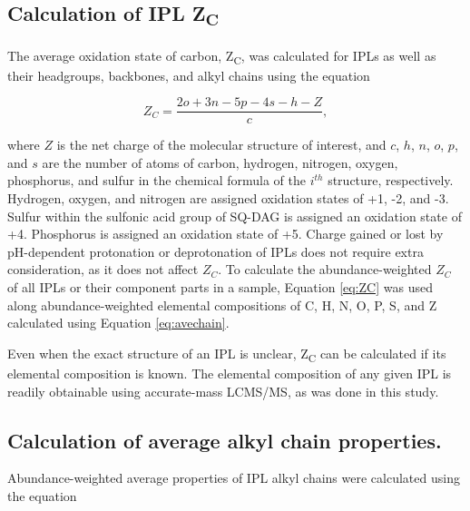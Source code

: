 \subsection{Calculation of IPL Z\textsubscript{C}}
The average oxidation state of carbon, Z\textsubscript{C}, was calculated for IPLs as well as their headgroups, backbones, and alkyl chains using the equation



\begin{equation} \label{eq:ZC}
{Z}_{C} = \frac{2o + 3n - 5p - 4s - h - Z}{c},
\end{equation}

\noindent where $Z$ is the net charge of the molecular structure of interest, and $c$, $h$, $n$, $o$, $p$, and $s$ are the number of atoms of carbon, hydrogen, nitrogen, oxygen, phosphorus, and sulfur in the chemical formula of the $i^{th}$ structure, respectively. Hydrogen, oxygen, and nitrogen are assigned oxidation states of +1, -2, and -3. Sulfur within the sulfonic acid group of SQ-DAG is assigned an oxidation state of +4. Phosphorus is assigned an oxidation state of +5. Charge gained or lost by pH-dependent protonation or deprotonation of IPLs does not require extra consideration, as it does not affect $Z_{C}$. To calculate the abundance-weighted $Z_{C}$ of all IPLs or their component parts in a sample, Equation \ref{eq:ZC} was used along abundance-weighted elemental compositions of C, H, N, O, P, S, and Z calculated using Equation \ref{eq:avechain}.

Even when the exact structure of an IPL is unclear, Z\textsubscript{C} can be calculated if its elemental composition is known. The elemental composition of any given IPL is readily obtainable using accurate-mass LCMS/MS, as was done in this study.

\subsection{Calculation of average alkyl chain properties.}
Abundance-weighted average properties of IPL alkyl chains were calculated using the equation

